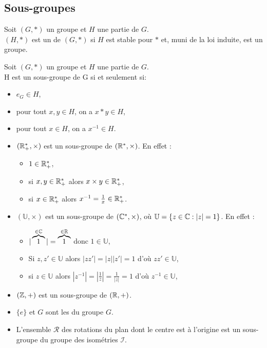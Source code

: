\documentclass{book}
\begin{document}
\subsection{Sous-groupes}
\begin{Definition}
Soit $(G, *)$ un groupe et $H$ une partie de $G$.\\
$(H, *)$ est un  de $(G, *)$  si $H$ est stable pour $*$ et, muni de la loi induite, est un groupe.
\end{Definition}
\begin{Proposition}
Soit $(G, *)$ un groupe et $H$ une partie de $G$.\\
H est un sous-groupe de G si et seulement si:
\begin{itemize}
  \item $e_G \in H$,
  \item pour tout $x, y \in H$, on a $x * y \in H$,
  \item pour tout $x \in H$, on a $x^{-1} \in H$.
\end{itemize}
\end{Proposition}
\begin{Exemple}
\begin{itemize}
  \item $(\mathbb{R}^*_+,\times)$ est un sous-groupe de $(\mathbb{R}^*,\times)$.
En effet :
  \begin{itemize}
     \item $1 \in \mathbb{R}^*_+$,
     \item si $x,y \in \mathbb{R}^*_+$ alors $x\times y \in \mathbb{R}^*_+$,
     \item si $x \in \mathbb{R}^*_+$ alors $x^{-1} = \frac 1 x \in \mathbb{R}^*_+$.
   \end{itemize}
  \item $(\mathbb{U},\times)$ est un sous-groupe de $(\mathbb{C}^*,\times)$, où
$\mathbb{U} = \{ z \in \mathbb{C} : |z|=1 \}$. 
En effet :
  \begin{itemize}
     \item $|\overbrace{1}^{\in\mathbb{C}}|=\overbrace{1}^{\in\mathbb{R}}$ donc $1\in\mathbb{U}$,
     \item Si $z,z' \in \mathbb{U}$ alors $|zz'|=|z||z'|=1$ d'où  $zz' \in \mathbb{U}$,
     \item si $z \in \mathbb{U}$ alors $|z^{-1}|=\left|\frac{1}{z}\right|=\frac{1}{|z|}=1$ d'où  $z^{-1} \in \mathbb{U}$,
   \end{itemize}
  \item $(\mathbb{Z},+)$ est un sous-groupe de $(\mathbb{R},+)$.
  \item $\{e\}$ et $G$ sont les  du groupe $G$.
  \item L'ensemble $\mathcal{R}$ des rotations du plan dont le centre est à l'origine
est un sous-groupe du groupe des isométries $\mathcal{I}$.
\end{itemize}
\end{Exemple}
\end{document}
